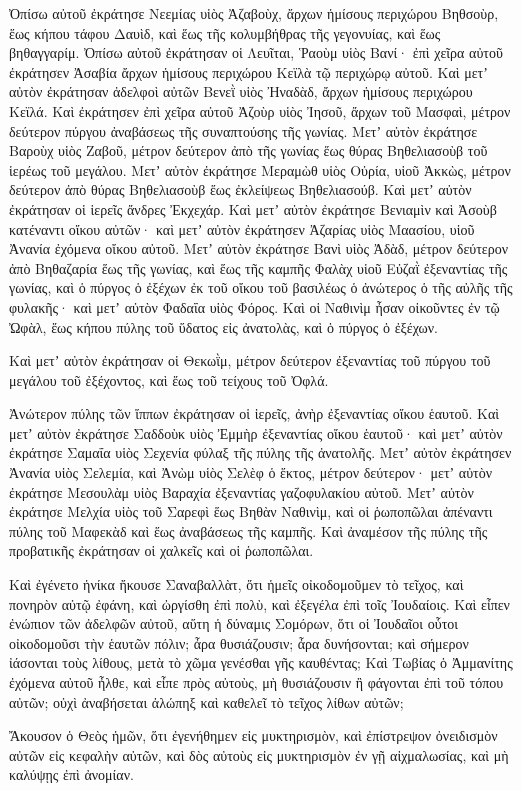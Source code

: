 {Ὀπίσω αὐτοῦ ἐκράτησε Νεεμίας υἱὸς Ἀζαβοὺχ, ἄρχων ἡμίσους περιχώρου Βηθσοὺρ, ἕως κήπου τάφου Δαυὶδ, καὶ ἕως τῆς κολυμβήθρας τῆς γεγονυίας, καὶ ἕως βηθαγγαρίμ.
Ὀπίσω αὐτοῦ ἐκράτησαν οἱ Λευῖται, Ῥαοὺμ υἱὸς Βανί· ἐπὶ χεῖρα αὐτοῦ ἐκράτησεν Ἀσαβία ἄρχων ἡμίσους περιχώρου Κεϊλὰ τῷ περιχώρῳ αὐτοῦ.
Καὶ μετʼ αὐτὸν ἐκράτησαν ἀδελφοὶ αὐτῶν Βενεῒ υἱὸς Ἠναδὰδ, ἄρχων ἡμίσους περιχώρου Κεϊλά.
Καὶ ἐκράτησεν ἐπὶ χεῖρα αὐτοῦ Ἀζοὺρ υἱὸς Ἰησοῦ, ἄρχων τοῦ Μασφαὶ, μέτρον δεύτερον πύργου ἀναβάσεως τῆς συναπτούσης τῆς γωνίας.
Μετʼ αὐτὸν ἐκράτησε Βαροὺχ υἱὸς Ζαβοῦ, μέτρον δεύτερον ἀπὸ τῆς γωνίας ἕως θύρας Βηθελιασοὺβ τοῦ ἱερέως τοῦ μεγάλου.
Μετʼ αὐτὸν ἐκράτησε Μεραμὼθ υἱὸς Οὐρία, υἱοῦ Ἀκκὼς, μέτρον δεύτερον ἀπὸ θύρας Βηθελιασοὺβ ἕως ἐκλείψεως Βηθελιασούβ.
Καὶ μετʼ αὐτὸν ἐκράτησαν οἱ ἱερεῖς ἄνδρες Ἐκχεχάρ.
Καὶ μετʼ αὐτὸν ἐκράτησε Βενιαμὶν καὶ Ἀσοὺβ κατέναντι οἴκου αὐτῶν· καὶ μετʼ αὐτὸν ἐκράτησεν Ἀζαρίας υἱὸς Μαασίου, υἱοῦ Ἀνανία ἐχόμενα οἴκου αὐτοῦ.
Μετʼ αὐτὸν ἐκράτησε Βανὶ υἱὸς Ἀδὰδ, μέτρον δεύτερον ἀπὸ
Βηθαζαρία ἕως τῆς γωνίας, καὶ ἕως τῆς καμπῆς Φαλὰχ υἱοῦ Εὐζαῒ ἐξεναντίας τῆς γωνίας, καὶ ὁ πύργος ὁ ἐξέχων ἐκ τοῦ οἴκου τοῦ βασιλέως ὁ ἀνώτερος ὁ τῆς αὐλῆς τῆς φυλακῆς· καὶ μετʼ αὐτὸν Φαδαΐα υἱὸς Φόρος.
Καὶ οἱ Ναθινὶμ ἦσαν οἰκοῦντες ἐν τῷ Ὠφὰλ, ἕως κήπου πύλης τοῦ ὕδατος εἰς ἀνατολὰς, καὶ ὁ πύργος ὁ ἐξέχων.
\par }{\PP {}Καὶ μετʼ αὐτὸν ἐκράτησαν οἱ Θεκωῒμ, μέτρον δεύτερον ἐξεναντίας τοῦ πύργου τοῦ μεγάλου τοῦ ἐξέχοντος, καὶ ἕως τοῦ τείχους τοῦ Ὀφλά.
\par }{\PP {}Ἀνώτερον πύλης τῶν ἵππων ἐκράτησαν οἱ ἱερεῖς, ἀνὴρ ἐξεναντίας οἴκου ἑαυτοῦ.
Καὶ μετʼ αὐτὸν ἐκράτησε Σαδδοὺκ υἱὸς Ἐμμὴρ ἐξεναντίας οἴκου ἑαυτοῦ· καὶ μετʼ αὐτὸν ἐκράτησε Σαμαΐα υἱὸς Σεχενία φύλαξ τῆς πύλης τῆς ἀνατολῆς.
Μετʼ αὐτὸν ἐκράτησεν Ἀνανία υἱὸς Σελεμία, καὶ Ἀνὼμ υἱὸς Σελὲφ ὁ ἕκτος, μέτρον δεύτερον· μετʼ αὐτὸν ἐκράτησε Μεσουλὰμ υἱὸς Βαραχία ἐξεναντίας γαζοφυλακίου αὐτοῦ.
Μετʼ αὐτὸν ἐκράτησε Μελχία υἱὸς τοῦ Σαρεφὶ ἕως Βηθὰν Ναθινὶμ, καὶ οἱ ῥωποπῶλαι ἀπέναντι πύλης τοῦ Μαφεκὰδ καὶ ἕως ἀναβάσεως τῆς καμπῆς.
Καὶ ἀναμέσον τῆς πύλης τῆς προβατικῆς ἐκράτησαν οἱ χαλκεῖς καὶ οἱ ῥωποπῶλαι.
\par }{\PP {}Καὶ ἐγένετο ἡνίκα ἤκουσε Σαναβαλλὰτ, ὅτι ἡμεῖς οἰκοδομοῦμεν τὸ τεῖχος, καὶ πονηρὸν αὐτῷ ἐφάνη, καὶ ὠργίσθη ἐπὶ πολὺ, καὶ ἐξεγέλα ἐπὶ τοῖς Ἰουδαίοις.
Καὶ εἶπεν ἐνώπιον τῶν ἀδελφῶν αὐτοῦ, αὕτη ἡ δύναμις Σομόρων, ὅτι οἱ Ἰουδαῖοι οὗτοι οἰκοδομοῦσι τὴν ἑαυτῶν πόλιν; ἆρα θυσιάζουσιν; ἆρα δυνήσονται; καὶ σήμερον ἰάσονται τοὺς λίθους, μετὰ τὸ χῶμα γενέσθαι γῆς καυθέντας;
Καὶ Τωβίας ὁ Ἀμμανίτης ἐχόμενα αὐτοῦ ἦλθε, καὶ εἶπε πρὸς αὐτοὺς, μὴ θυσιάζουσιν ἢ φάγονται ἐπὶ τοῦ τόπου αὐτῶν; οὐχὶ ἀναβήσεται ἀλώπηξ καὶ καθελεῖ τὸ τεῖχος λίθων αὐτῶν;
\par }{\PP {}Ἄκουσον ὁ Θεὸς ἡμῶν, ὅτι ἐγενήθημεν εἰς μυκτηρισμὸν, καὶ ἐπίστρεψον ὀνειδισμὸν αὐτῶν εἰς κεφαλὴν αὐτῶν, καὶ δὸς αὐτοὺς εἰς μυκτηρισμὸν ἐν γῇ αἰχμαλωσίας,
καὶ μὴ καλύψῃς ἐπὶ ἀνομίαν.

}

